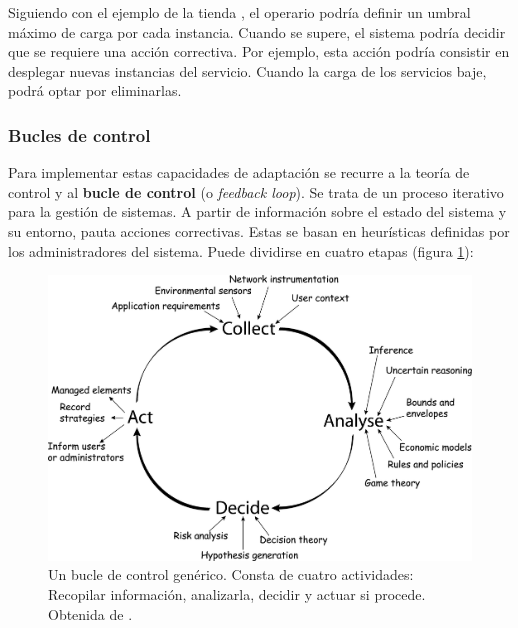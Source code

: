 Siguiendo con el ejemplo de la tienda , el operario podría definir un umbral máximo de carga por cada instancia. Cuando se supere, el sistema podría decidir que se requiere una acción correctiva. Por ejemplo, esta acción podría consistir en desplegar nuevas instancias del servicio. Cuando la carga de los servicios baje, podrá optar por eliminarlas.

\subsubsection{Bucles de control}

Para implementar estas capacidades de adaptación se recurre a la teoría de control y al \textbf{bucle de control} (o \emph{feedback loop}). \cite{brunEngineeringSelfAdaptiveSystems2009} Se trata de un proceso iterativo para la gestión de sistemas. A partir de información sobre el estado del sistema y su entorno, pauta acciones correctivas. Estas se basan en heurísticas definidas por los administradores del sistema. Puede dividirse en cuatro etapas (figura \ref{fig:bucle-control}):

\begin{figure}[h]
  \centering
  \includegraphics[scale=0.065]{cap_introduccion/images/feedback-loop}
  \caption[Un bucle de control genérico. Consta de cuatro actividades: Recopilar información, analizarla, decidir y actuar si procede.]{Un bucle de control genérico. Consta de cuatro actividades: Recopilar información, analizarla, decidir y actuar si procede. Obtenida de \cite{dobsonSurveyAutonomicCommunications2006}.}
  \label{fig:bucle-control}
\end{figure}

